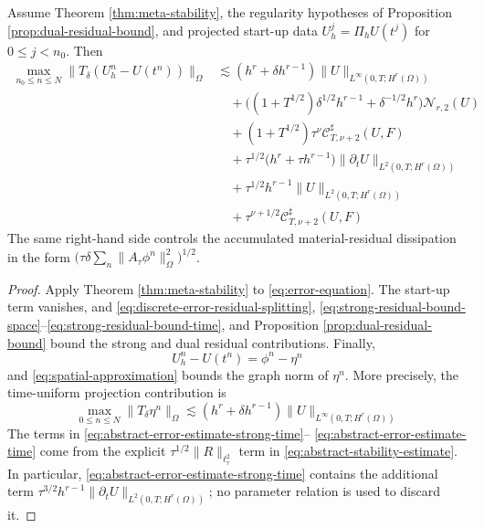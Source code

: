 \documentclass[11pt]{article}
\begin{document}
\begin{thm}
\label{thm:meta-half}
Assume Theorem \ref{thm:meta-stability}, the regularity hypotheses of
Proposition \ref{prop:dual-residual-bound}, and projected start-up data
\(U_h^j=\Pi_hU(t^j)\) for \(0\le j<n_0\). Then
\begin{align}
\max_{n_0\le n\le N}\|T_{\delta}(U_h^n-U(t^n))\|_{\Omega}
&\lesssim (h^r+\delta h^{r-1})
\|U\|_{L^{\infty}(0,T;H^r(\Omega))} \label{eq:abstract-error-estimate-space}\\
&\quad+
\bigl((1+T^{1/2})\delta^{1/2}h^{r-1}+\delta^{-1/2}h^r\bigr)
\mathcal N_{r,2}(U) \label{eq:abstract-error-estimate-dual}\\
&\quad+(1+T^{1/2})\tau^\nu\mathcal C^{\sharp}_{T,\nu+2}(U,F)
\label{eq:abstract-error-estimate-truncation}\\
&\quad+\tau^{1/2}\bigl(h^r+\tau h^{r-1}\bigr)
\|\partial_tU\|_{L^2(0,T;H^r(\Omega))}
\label{eq:abstract-error-estimate-strong-time}\\
&\quad+\tau^{1/2}h^{r-1}
\|U\|_{L^2(0,T;H^r(\Omega))}
\label{eq:abstract-error-estimate-strong-space}\\
&\quad+\tau^{\nu+1/2}\mathcal C^{\sharp}_{T,\nu+2}(U,F)
\label{eq:abstract-error-estimate-time}
\end{align}
The same right-hand side controls the accumulated material-residual
dissipation in the form
\(\bigl(\tau\delta\sum_n\|A_{\tau}\phi^n\|_{\Omega}^2\bigr)^{1/2}\).
\end{thm}
\begin{proof}
Apply Theorem \ref{thm:meta-stability} to \eqref{eq:error-equation}. The
start-up term vanishes, and
\eqref{eq:discrete-error-residual-splitting},
\eqref{eq:strong-residual-bound-space}--\eqref{eq:strong-residual-bound-time},
and Proposition \ref{prop:dual-residual-bound}
bound the strong and dual residual contributions. Finally,
\begin{equation}
U_h^n-U(t^n)=\phi^n-\eta^n \label{eq:total-error-identity}
\end{equation}
and \eqref{eq:spatial-approximation} bounds the graph norm of \(\eta^n\).
More precisely, the time-uniform projection contribution is
\begin{equation}
\max_{0\le n\le N}\|T_{\delta}\eta^n\|_{\Omega}
\lesssim(h^r+\delta h^{r-1})
\|U\|_{L^{\infty}(0,T;H^r(\Omega))} \label{eq:projection-graph-norm-bound}
\end{equation}
The terms in \eqref{eq:abstract-error-estimate-strong-time}--
\eqref{eq:abstract-error-estimate-time} come from the explicit
\(\tau^{1/2}\|R\|_{\ell_{\tau}^2}\) term in
\eqref{eq:abstract-stability-estimate}. In particular,
\eqref{eq:abstract-error-estimate-strong-time} contains the additional term
\(\tau^{3/2}h^{r-1}
\|\partial_tU\|_{L^2(0,T;H^r(\Omega))}\); no parameter relation is used to
discard it.
\end{proof}
\end{document}
